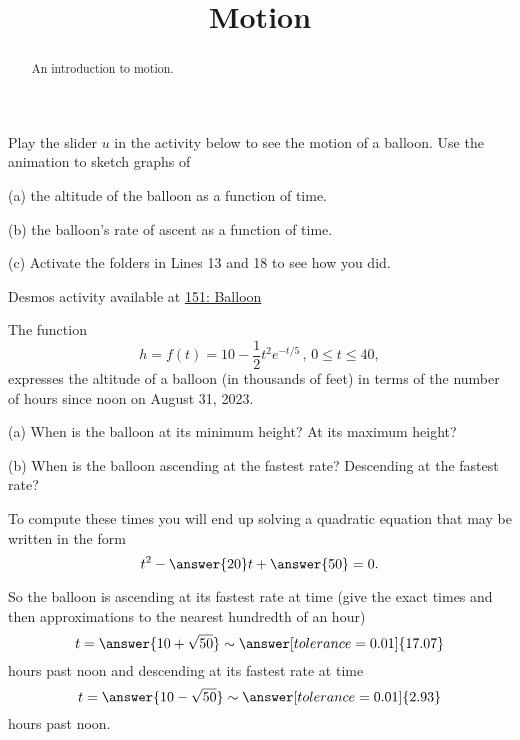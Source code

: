 \documentclass{ximera}
\title{Motion}
\begin{document}
\begin{abstract}
An introduction to motion.
\end{abstract}
\maketitle


\begin{question}  \label{Q:4sdfdsfdellk}

Play the slider $u$ in the activity below to see the motion of a balloon. Use the animation to sketch graphs of

(a) the altitude of the balloon as a function of time.

(b) the balloon's rate of ascent as a function of time.

(c) Activate the folders in Lines 13 and 18 to see how you did.

\begin{onlineOnly}
    \begin{center}
\end{center}
\end{onlineOnly}

Desmos activity available at \href{https://www.desmos.com/calculator/buhgm24hfx}{151: Balloon}

\end{question}


\begin{question}  \label{QDfsdtegg}
The function
\[
     h = f(t) = 10 - \frac{1}{2}t^2 e^{-t/5} \, , \, 0\leq t \leq 40,
\]
expresses the altitude of a balloon (in thousands of feet) in terms of the number of hours since noon on August 31, 2023.

(a) When is the balloon at its minimum height? At its maximum height?

(b) When is the balloon ascending at the fastest rate? Descending at the fastest rate? 

To compute these times you will end up solving a quadratic equation that may be written in the form
\[
    t^2 - \answer{20}t + \answer{50} = 0.
\]
 
So the balloon is ascending at its fastest rate at time (give the exact times and then approximations to the nearest hundredth of an hour)
\[
    t = \answer{10 + \sqrt{50}} \sim \answer[tolerance=0.01]{17.07}
\]
hours past noon and descending at its fastest rate at time
\[
   t = \answer{10 - \sqrt{50}} \sim \answer[tolerance=0.01]{2.93}
\]
hours past noon.

\end{question}
\end{document}
